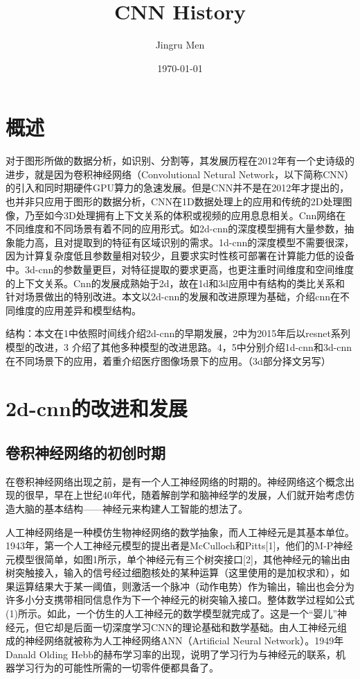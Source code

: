 \documentclass[15pt]{article}
\title{CNN History}
\author{Jingru Men}
\date{\today}
\begin{document}
\maketitle
\tableofcontents
\newpage
\section{概述}
对于图形所做的数据分析，如识别、分割等，其发展历程在2012年有一个史诗级的进步，就是因为卷积神经网络（Convolutional Netural Network，以下简称CNN）的引入和同时期硬件GPU算力的急速发展。但是CNN并不是在2012年才提出的，也并非只应用于图形的数据分析，CNN在1D数据处理上的应用和传统的2D处理图像，乃至如今3D处理拥有上下文关系的体积或视频的应用息息相关。Cnn网络在不同维度和不同场景有着不同的应用形式。如2d-cnn的深度模型拥有大量参数，抽象能力高，且对提取到的特征有区域识别的需求。1d-cnn的深度模型不需要很深，因为计算复杂度低且参数量相对较少，且要求实时性核可部署在计算能力低的设备中。3d-cnn的参数量更巨，对特征提取的要求更高，也更注重时间维度和空间维度的上下文关系。Cnn的发展成熟始于2d，故在1d和3d应用中有结构的类比关系和针对场景做出的特别改进。本文以2d-cnn的发展和改进原理为基础，介绍cnn在不同维度的应用差异和模型结构。

结构：本文在1中依照时间线介绍2d-cnn的早期发展，2中为2015年后以resnet系列模型的改进，3 介绍了其他多种模型的改进思路。4，5中分别介绍1d-cnn和3d-cnn在不同场景下的应用，着重介绍医疗图像场景下的应用。（3d部分择文另写） 

\section{2d-cnn的改进和发展}
\subsection{卷积神经网络的初创时期}
在卷积神经网络出现之前，是有一个人工神经网络的时期的。神经网络这个概念出现的很早，早在上世纪40年代，随着解剖学和脑神经学的发展，人们就开始考虑仿造大脑的基本结构——神经元来构建人工智能的想法了。

人工神经网络是一种模仿生物神经网络的数学抽象，而人工神经元是其基本单位。1943年，第一个人工神经元模型的提出者是McCulloch和Pitts[1]，他们的M-P神经元模型很简单，如图1所示，单个神经元有三个树突接口[2]，其他神经元的输出由树突触接入，输入的信号经过细胞核处的某种运算（这里使用的是加权求和），如果运算结果大于某一阈值，则激活一个脉冲（动作电势）作为输出，输出也会分为许多小分支携带相同信息作为下一个神经元的树突输入接口。整体数学过程如公式(1)所示。如此，一个仿生的人工神经元的数学模型就完成了。这是一个“婴儿”神经元，但它却是后面一切深度学习CNN的理论基础和数学基础。由人工神经元组成的神经网络就被称为人工神经网络ANN（Artificial Neural Network）。1949年Danald Olding Hebb的赫布学习率的出现，说明了学习行为与神经元的联系，机器学习行为的可能性所需的一切零件便都具备了。
\end{document}
